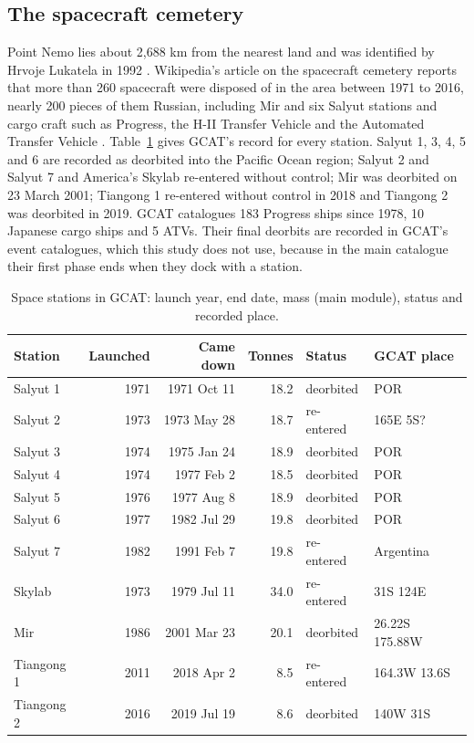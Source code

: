\documentclass[11pt,a4paper]{article}
\begin{document}
\subsection{The spacecraft cemetery}
Point Nemo lies about 2,688 km from the nearest land and was identified by Hrvoje Lukatela in 1992 \citep{wikinemo}. Wikipedia's article on the spacecraft cemetery reports that more than 260 spacecraft were disposed of in the area between 1971 to 2016, nearly 200 pieces of them Russian, including Mir and six Salyut stations and cargo craft such as Progress, the H-II Transfer Vehicle and the Automated Transfer Vehicle \citep{wikicem}. Table~\ref{tab:stations} gives GCAT's record for every station. Salyut 1, 3, 4, 5 and 6 are recorded as deorbited into the Pacific Ocean region; Salyut 2 and Salyut 7 and America's Skylab re-entered without control; Mir was deorbited on 23 March 2001; Tiangong 1 re-entered without control in 2018 and Tiangong 2 was deorbited in 2019. GCAT catalogues 183 Progress ships since 1978, 10 Japanese cargo ships and 5 ATVs. Their final deorbits are recorded in GCAT's event catalogues, which this study does not use, because in the main catalogue their first phase ends when they dock with a station.

\begin{table}[tbp]\centering\small\caption{Space stations in GCAT: launch year, end date, mass (main module), status and recorded place.}\label{tab:stations}\begin{tabular}{lrrrll}\toprule Station & Launched & Came down & Tonnes & Status & GCAT place\\\midrule
Salyut 1 & 1971 & 1971 Oct 11 & 18.2 & deorbited & POR\\
Salyut 2 & 1973 & 1973 May 28 & 18.7 & re-entered & 165E 5S?\\
Salyut 3 & 1974 & 1975 Jan 24 & 18.9 & deorbited & POR\\
Salyut 4 & 1974 & 1977 Feb  2 & 18.5 & deorbited & POR\\
Salyut 5 & 1976 & 1977 Aug  8 & 18.9 & deorbited & POR\\
Salyut 6 & 1977 & 1982 Jul 29 & 19.8 & deorbited & POR\\
Salyut 7 & 1982 & 1991 Feb  7 & 19.8 & re-entered & Argentina\\
Skylab & 1973 & 1979 Jul 11 & 34.0 & re-entered & 31S 124E\\
Mir & 1986 & 2001 Mar 23 & 20.1 & deorbited & 26.22S 175.88W\\
Tiangong 1 & 2011 & 2018 Apr  2 & 8.5 & re-entered & 164.3W 13.6S\\
Tiangong 2 & 2016 & 2019 Jul 19 & 8.6 & deorbited & 140W 31S\\
\bottomrule\end{tabular}\end{table}
\end{document}
